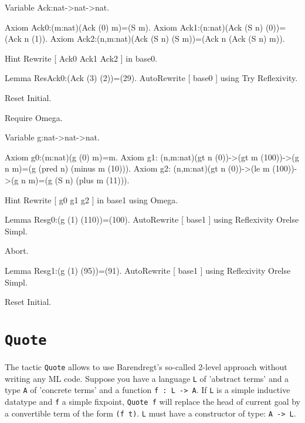 \begin{coq_example*}
\begin{coq_example*}
Variable Ack:nat->nat->nat.

Axiom Ack0:(m:nat)(Ack (0) m)=(S m).
Axiom Ack1:(n:nat)(Ack (S n) (0))=(Ack n (1)).
Axiom Ack2:(n,m:nat)(Ack (S n) (S m))=(Ack n (Ack (S n) m)).
\end{coq_example*}

\begin{coq_example}
Hint Rewrite [ Ack0 Ack1 Ack2 ] in base0.

Lemma ResAck0:(Ack (3) (2))=(29).
AutoRewrite [ base0 ] using Try Reflexivity.
\end{coq_example}

\begin{coq_eval}
Reset Initial.  
\end{coq_eval}


\begin{coq_example*}
Require Omega.

Variable g:nat->nat->nat.

Axiom g0:(m:nat)(g (0) m)=m.
Axiom g1:
  (n,m:nat)(gt n (0))->(gt m (100))->(g n m)=(g (pred n) (minus m (10))).
Axiom g2:
  (n,m:nat)(gt n (0))->(le m (100))->(g n m)=(g (S n) (plus m (11))).
\end{coq_example*}

\begin{coq_example}
Hint Rewrite [ g0 g1 g2 ] in base1 using Omega.

Lemma Resg0:(g (1) (110))=(100).
AutoRewrite [ base1 ] using Reflexivity Orelse Simpl.
\end{coq_example}

\begin{coq_eval}
Abort.
\end{coq_eval}

\begin{coq_example}
Lemma Resg1:(g (1) (95))=(91).
AutoRewrite [ base1 ] using Reflexivity Orelse Simpl.
\end{coq_example}

\begin{coq_eval}
Reset Initial.
\end{coq_eval}

\section{\tt Quote}
\label{Quote-examples}

The tactic \texttt{Quote} allows to use Barendregt's so-called
2-level approach without writing any ML code. Suppose you have a
language \texttt{L} of 
'abstract terms' and a type \texttt{A} of 'concrete terms' 
and a function \texttt{f : L -> A}. If \texttt{L} is a simple
inductive datatype and \texttt{f} a simple fixpoint, \texttt{Quote f}
will replace the head of current goal by a convertible term of the form 
\texttt{(f t)}. \texttt{L} must have a constructor of type: \texttt{A
  -> L}. 


\end{coq_example*}
